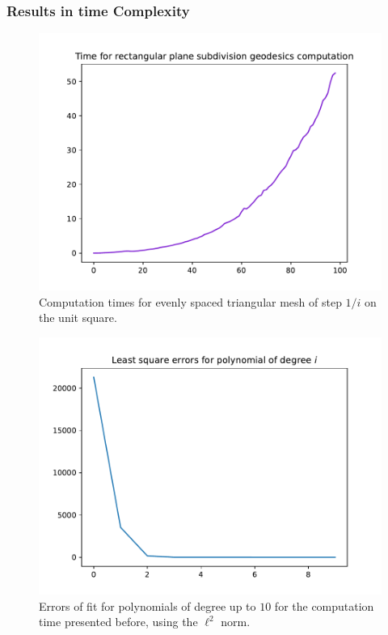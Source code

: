 \documentclass{beamercours}
\begin{document}
\begin{frame}[allowframebreaks]
	\frametitle{Results in time Complexity}
	\begin{figure}[h]
		\centering
		\includegraphics[scale=.4]{Figures/tim_comp_planes_i<=100}
		\caption{Computation times for evenly spaced triangular mesh of step $1/i$ on the unit square.}
		\label{computationtime}
	\end{figure}
	\framebreak


	\begin{figure}[h]
		\centering
		\includegraphics[scale=.4]{Figures/polyfiterrors}
		\caption{Errors of fit for polynomials of degree up to $10$ for the computation time presented before, using the $\ell^{2}$ norm.}
		\label{polyfiterrors}
	\end{figure}
\end{frame}
\end{document}
